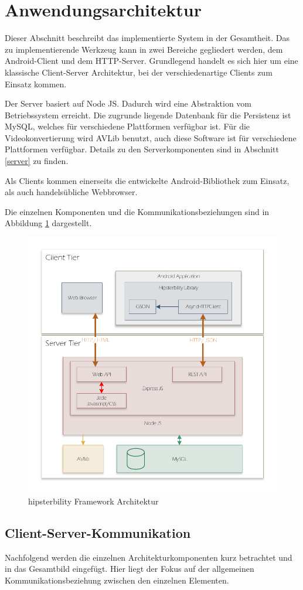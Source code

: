 \section{Anwendungsarchitektur}
\label{app_architecture}
Dieser Abschnitt beschreibt das implementierte System in der Gesamtheit. Das zu implementierende Werkzeug kann in zwei Bereiche gegliedert werden, dem Android-Client und dem HTTP-Server. 
Grundlegend handelt es sich hier um eine klassische Client-Server Architektur, bei der verschiedenartige Clients zum Einsatz kommen.

Der Server basiert auf Node JS.
Dadurch wird eine Abstraktion vom Betriebssystem erreicht.
Die zugrunde liegende Datenbank für die Persistenz ist MySQL, welches für verschiedene Plattformen verfügbar ist.
Für die Videokonvertierung wird AVLib benutzt, auch diese Software ist für verschiedene Plattformen verfügbar. Details zu den Serverkomponenten sind in Abschnitt \ref{server} zu finden.

Als Clients kommen einerseits die entwickelte Android-Bibliothek zum Einsatz, als auch handelsübliche Webbrowser.

Die einzelnen Komponenten und die Kommunikationsbeziehungen sind in Abbildung \ref{fig:architecture} dargestellt.

\begin{figure}[htb]
	\centering
	\includegraphics[width=0.75\linewidth]{img/architecture}
	\caption{hipsterbility Framework Architektur\label{fig:architecture}}
\end{figure}

\subsection{Client-Server-Kommunikation}
Nachfolgend werden die einzelnen Architekturkomponenten kurz betrachtet und in das Gesamtbild eingefügt. Hier liegt der Fokus auf der allgemeinen Kommunikationsbeziehung zwischen den einzelnen Elementen.


